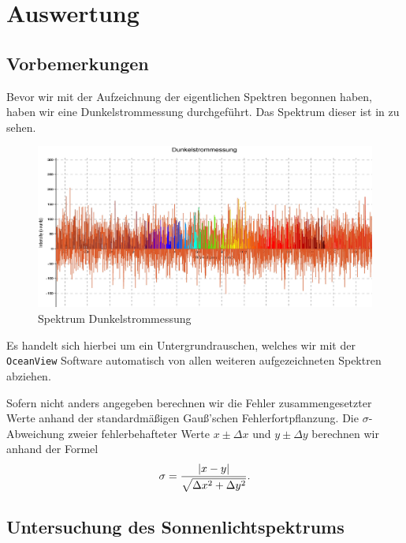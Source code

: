 \section{Auswertung}

\subsection*{Vorbemerkungen}

Bevor wir mit der Aufzeichnung der eigentlichen Spektren begonnen haben, haben wir eine Dunkelstrommessung durchgeführt. Das Spektrum dieser ist in  zu sehen.

\begin{figure}[H]
  \centering
  \includegraphics[width=.9\textwidth]{files/pngs/dunkelstrommessung.png}
  \caption{Spektrum Dunkelstrommessung}
  \label{fig:dunkelstrommessung}  
\end{figure}

Es handelt sich hierbei um ein Untergrundrauschen, welches wir mit der \texttt{OceanView} Software automatisch von allen weiteren aufgezeichneten Spektren abziehen.

Sofern nicht anders angegeben berechnen wir die Fehler zusammengesetzter Werte anhand der standardmäßigen Gauß'schen Fehlerfortpflanzung. Die $\sigma$-Abweichung zweier fehlerbehafteter Werte $x \pm \Delta x$ und $y \pm \Delta y$ berechnen wir anhand der Formel
\begin{align}
  \sigma = \frac{\qty|x - y|}{\sqrt{\Delta x^2 + \Delta y^2}}.
\end{align}

\subsection{Untersuchung des Sonnenlichtspektrums}

